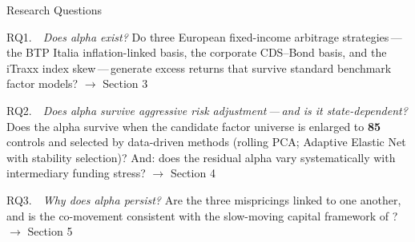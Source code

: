 \documentclass[aspectratio=169,11pt]{beamer}
\begin{document}
\begin{frame}[t]{Research Questions}
\vspace{0.15cm}

\small

\begin{block}{\normalsize RQ1.\ \ \emph{Does alpha exist?}}
Do three European fixed-income arbitrage strategies\,---\,the BTP Italia
inflation-linked basis, the corporate CDS--Bond basis, and the iTraxx
index skew\,---\,generate excess returns that survive standard
benchmark factor models?
\hfill\textcolor{softgrey}{\footnotesize $\rightarrow$ Section 3}
\end{block}

\vspace{0.15cm}

\begin{block}{\normalsize RQ2.\ \ \emph{Does alpha survive aggressive risk adjustment\,---\,and is it state-dependent?}}
Does the alpha survive when the candidate factor universe is enlarged
to \textbf{85} controls and selected by data-driven methods (rolling PCA;
Adaptive Elastic Net with stability selection)?
And: does the residual alpha vary systematically with intermediary funding stress?
\hfill\textcolor{softgrey}{\footnotesize $\rightarrow$ Section 4}
\end{block}

\vspace{0.15cm}

\begin{block}{\normalsize RQ3.\ \ \emph{Why does alpha persist?}}
Are the three mispricings linked to one another, and is the
co-movement consistent with the slow-moving capital framework
of \citet{duffie2010presidential}?
\hfill\textcolor{softgrey}{\footnotesize $\rightarrow$ Section 5}
\end{block}

\end{frame}
\end{document}
